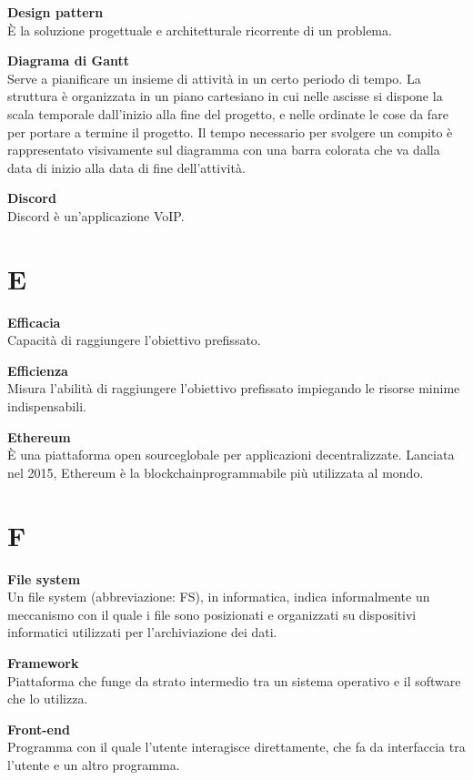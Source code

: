 \documentclass[a4paper, oneside, openany, dvipsnames, table, 12pt]{article}
\begin{document}
\textbf{Design pattern} \\
È la soluzione progettuale e architetturale ricorrente di un problema.

\textbf{Diagrama di Gantt} \\
Serve a pianificare un insieme di attività in un certo periodo di tempo. La struttura è organizzata in un piano cartesiano in cui nelle ascisse si dispone la scala temporale dall’inizio alla fine del progetto, e nelle ordinate le cose da fare per portare a termine il progetto. Il tempo necessario per svolgere un compito è rappresentato visivamente sul diagramma con una barra colorata che va dalla data di inizio alla data di fine dell’attività.

\textbf{Discord} \\
Discord è un'applicazione VoIP\glo.

\newpage
\section{E}
\textbf{Efficacia} \\
Capacità di raggiungere l'obiettivo prefissato.

\textbf{Efficienza} \\
Misura l'abilità di raggiungere l'obiettivo prefissato impiegando le risorse minime indispensabili.

\textbf{Ethereum} \\
È una piattaforma open source\glo globale per applicazioni decentralizzate. Lanciata nel 2015, Ethereum è la blockchain\glo programmabile più utilizzata al mondo.

\newpage
\section{F}
\textbf{File system} \\
Un file system (abbreviazione: FS), in informatica, indica informalmente un meccanismo con il quale i file sono posizionati e organizzati su dispositivi informatici utilizzati per l'archiviazione dei dati.

\textbf{Framework} \\
Piattaforma che funge da strato intermedio tra un sistema operativo e il software che lo utilizza.

\label{par:frontend}
\textbf{Front-end} \\
Programma con il quale l’utente interagisce direttamente, che fa da interfaccia tra l’utente e un altro programma.
\end{document}
